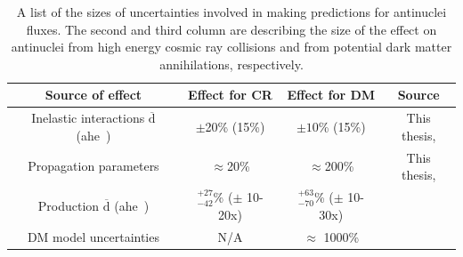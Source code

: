 \begin{table}[htpb]
    \centering
    \begin{tabular}{|c|c|c|c|}
        \hline
        Source of effect & Effect for CR  & Effect for DM & Source \\
        \hline 
        Inelastic interactions $\mathrm{\overline{d}}$ (ahe\ )& $\pm$20\% (15\%) & $\pm 10 $\% (15\%) & This thesis, \cite{dbar_prop_paper, he3_absorption_paper}\\
        \hline
        Propagation parameters & $\approx$20\% & $\approx$200\% & This thesis, \cite{dbar_prop_paper}\\
        \hline
        Production  $\mathrm{\overline{d}}$ (ahe\ )& $^{+27}_{-42}$\% ($\pm$ 10-20x) &  $^{+63}_{-70}$\% ($\pm$ 10-30x) & \cite{dbar_prop_paper, Ibarra2014, Korsmeier:2017xzj}\\
        \hline
        DM model uncertainties & N/A & $\approx$ 1000\% & \cite{dbar_prop_paper} \\
        \hline
    \end{tabular}
    \caption{A list of the sizes of uncertainties involved in making predictions for antinuclei fluxes. The second and third column are describing the size of the effect on antinuclei from high energy cosmic ray collisions and from potential dark matter annihilations, respectively.}
    \label{tab:uncertaintiesFluxes}

\end{table}


